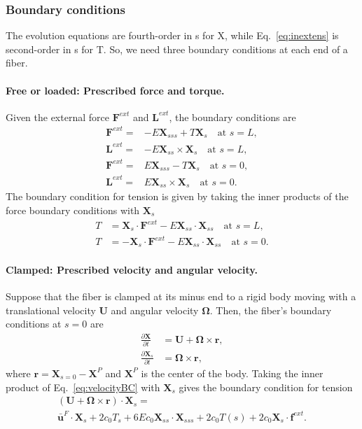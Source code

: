 \documentclass{article}
\newcommand{\OOmega}{\boldsymbol{\Omega}}
\newcommand{\UU}{\mathbf{U}}
\newcommand{\XX}{\mathbf{X}}
\newcommand{\rr}{\mathbf{r}}
\newcommand{\ubarF}{\bar{\mathbf{u}}^F}
\newcommand{\ff}{\mathbf{f}}
\newcommand{\FF}{\mathbf{F}}
\newcommand{\LL}{\mathbf{L}}
\begin{document}
\subsubsection{Boundary conditions}
The evolution equations are fourth-order in s for X, while Eq.~\eqref{eq:inextens} is second-order in s for T. So, we need three boundary conditions at each end of a fiber.
\paragraph{Free or loaded: Prescribed force and torque.}
Given the external force $\FF^{ext}$ and $\LL^{ext}$, the boundary conditions are
\begin{align}
\FF^{ext} =& -E\XX_{sss} + T\XX_s  \quad  \text{at} \,\, s = L, \\
\LL^{ext} =& -E\XX_{ss} \times \XX_s \quad  \text{at} \,\, s = L, \\
\FF^{ext} =& E\XX_{sss} - T\XX_s \quad  \text{at} \,\, s = 0,\\
\LL^{ext} =& E\XX_{ss} \times \XX_s \quad  \text{at} \,\, s = 0.
\end{align}
The boundary condition for tension is given by taking the inner products of the force boundary conditions with $\XX_s$
\begin{align}
T &= \XX_s \cdot \FF^{ext} - E \XX_{ss} \cdot \XX_{ss} \quad \text{at} \,\, s = L, \\
T &= -\XX_s \cdot \FF^{ext} - E \XX_{ss} \cdot \XX_{ss} \quad \text{at} \,\, s = 0.
\end{align}

\paragraph{Clamped: Prescribed velocity and angular velocity.}
Suppose that the fiber is clamped at its minus end to a rigid body moving with a translational velocity $\UU$ and angular velocity $\OOmega$. Then, the fiber's boundary conditions at $s = 0$ are
\begin{align}
\frac{\partial \XX}{\partial t}  & = \UU + \OOmega \times \mathbf{r}, \label{eq:velocityBC} \\
\frac{\partial \XX_s}{\partial t} & = \OOmega \times \mathbf{r}, \label{eq:rotBC}
\end{align}
where $\rr = \XX_{s=0} - \XX^P$ and $\XX^P$ is the center of the body. Taking the inner product of Eq.~\eqref{eq:velocityBC} with $\XX_s$ gives the boundary condition for tension
\begin{multline}
(\UU + \OOmega \times \rr)\cdot \XX_s  = \\
\ubarF \cdot \XX_s + 2c_0T_s + 6Ec_0\XX_{ss} \cdot \XX_{sss} + 2c_0 T(s) + 2c_0 \XX_s \cdot \ff^{ext}.
\end{multline}
\end{document}
